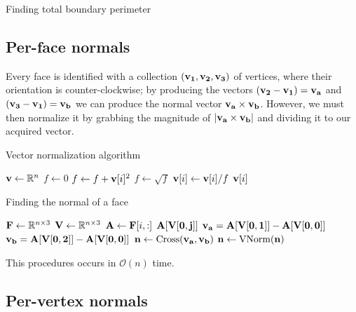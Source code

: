 \begin{algorithm}
\caption{Finding total boundary perimeter}
\begin{algorithmic}[1]

\EndProcedure
\end{algorithmic}
\end{algorithm}

\subsection{Per-face normals}

Every face is identified with a collection
$\bf{(v_1,v_2,v_3)}$ of vertices, where their
orientation is counter-clockwise; by producing
the vectors $\bf{(v_2-v_1)=v_a}$ and $\bf{(v_3-v_1)=v_b}$
we can produce the normal vector $\bf{v_a \times v_b}$.
However, we must then normalize it by grabbing the
magnitude of $\bf{|v_a \times v_b|}$ and dividing
it to our acquired vector.

\begin{algorithm}
\caption{Vector normalization algorithm}
\begin{algorithmic}[1]
\State $\bf{v} \gets \RR^n$ 
\State $f \gets 0$
    \State $f \gets f + \bf{v}[i]^2$
    \State $f \gets \sqrt{f}$
    \State $\bf{v}[i] \gets \bf{v}[i]/f$
    \State \Return $\bf{v}[i]$ 
    \EndFor
\EndProcedure
\end{algorithmic}
\end{algorithm}

\begin{algorithm}
\caption{Finding the normal of a face}
\begin{algorithmic}[1]
\State $\bf{F} \gets \RR^{n \times 3}$
\State $\bf{V} \gets \RR^{n \times 3}$
    \State $\bf{A} \gets \bf{F}[i, :]$ 
    \State $\bf{A[V[0, j]]}$
    \State $\bf{v_a = A[V[0,1]] - A[V[0,0]]} $
    \State $\bf{v_b = A[V[0,2]] - A[V[0,0]]} $
    \State $\bf{n} \gets \text{Cross}(\bf{v_a,v_b})$
    \State $\bf{n} \gets \text{VNorm}(\bf{n})$ 
\EndFor
\EndProcedure
\end{algorithmic}
\end{algorithm}

This procedures occurs in $\mathcal{O}(n)$ time.

\subsection{Per-vertex normals}

